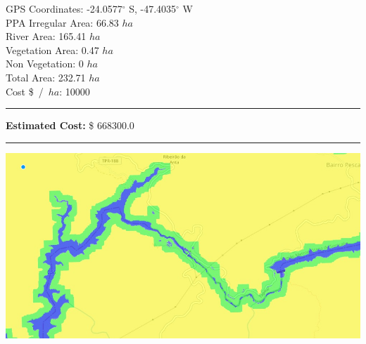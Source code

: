 \documentclass{article}
\begin{document}
    \begin{minipage}{0.5\linewidth}

    GPS Coordinates: -24.0577$^{\circ}$ S, -47.4035$^{\circ}$ W    \\
    PPA Irregular Area: 66.83 $ha$  \\
    River Area: 165.41 $ha$              \\
    Vegetation Area: 0.47 $ha$           \\
    Non Vegetation: 0 $ha$           \\
    Total Area: 232.71 $ha$              \\
    Cost \$~/~$ha$: 10000               \\
    \rule{\linewidth}{1pt}
    \textbf{Estimated Cost:} \$ 668300.0           \\
    \rule{\linewidth}{1pt}

    \end{minipage}\hfil
    \begin{minipage}{0.5\linewidth}
        \includegraphics[width=\linewidth]{map.jpg}
    \end{minipage}
    
    

    \pagebreak
\end{document}
